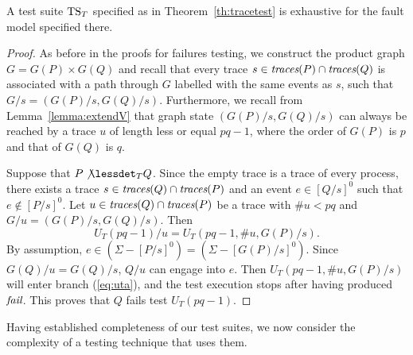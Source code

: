 \begin{lemma}\label{lemma:mainfexhaustivetrace}
A test suite ${\text{TS}}_T$ specified as in Theorem~\ref{th:tracetest} is
exhaustive for the fault model specified there.
\end{lemma}
\begin{proof}
As before in the proofs for failures testing, we construct the product graph
$G=G(P)\times G(Q)$ and recall that every trace $s\in\text{\it traces}(P)\cap\text{\it traces}(Q)$ is
associated with a path through $G$ labelled with the same events as $s$, such
that $G/s = (G(P)/s,G(Q)/s)$. Furthermore, we recall from
Lemma~\ref{lemma:extendV} that graph state $(G(P)/s,G(Q)/s)$ can always be
reached by a trace $u$ of length less or equal $pq-1$, where  the order of
$G(P)$ is $p$ and that of $G(Q)$ is $q$.

Suppose that $P\not\lessdet_T Q$. Since the empty trace is a trace of every
process, there exists a trace $s\in \text{\it traces}(Q)\cap\text{\it traces}(P)$ and an event $e\in
[Q/s]^0$ such that $e\not\in [P/s]^0$. Let $u\in \text{\it traces}(Q)\cap\text{\it traces}(P)$ be a
trace with $\#u < pq$ and $G/u = (G(P)/s,G(Q)/s)$. Then
$$
U_T(pq-1)/u = U_T(pq-1,\#u,G(P)/s).
$$
By assumption, $e\in (\Sigma -[P/s]^0) = (\Sigma - [G(P)/s]^0)$. Since
$G(Q)/u = G(Q)/s$, $Q/u$ can engage into $e$. Then $U_T(pq-1,\#u,G(P)/s)$
will enter branch (\ref{eq:uta}), and the test execution stops after having
produced ${\text{\it fail}}$. This proves that $Q$  fails test $U_T(pq-1)$. \xbox
\end{proof}
%
Having established completeness of our test suites, we now consider the
complexity of a testing technique that uses them. 
